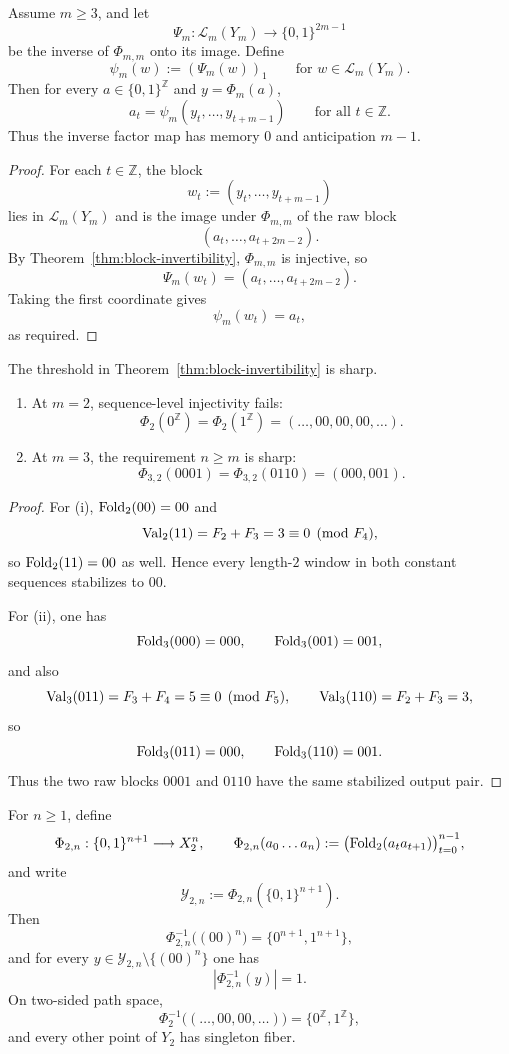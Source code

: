 \begin{corollary}\label{cor:explicit-decoder}
Assume $m\ge 3$, and let
\[
\Psi_m:\mathcal L_m(Y_m)\to\{0,1\}^{2m-1}
\]
be the inverse of $\Phi_{m,m}$ onto its image. Define
\[
\psi_m(w):=(\Psi_m(w))_1
\qquad\text{for }w\in\mathcal L_m(Y_m).
\]
Then for every $a\in\{0,1\}^{\mathbb Z}$ and $y=\Phi_m(a)$,
\[
a_t=\psi_m(y_t,\dots,y_{t+m-1})
\qquad\text{for all }t\in\mathbb Z.
\]
Thus the inverse factor map has memory $0$ and anticipation $m-1$.
\end{corollary}

\begin{proof}
For each $t\in\mathbb Z$, the block
\[
w_t:=(y_t,\dots,y_{t+m-1})
\]
lies in $\mathcal L_m(Y_m)$ and is the image under $\Phi_{m,m}$ of the raw block
\[
(a_t,\dots,a_{t+2m-2}).
\]
By Theorem~\ref{thm:block-invertibility}, $\Phi_{m,m}$ is injective, so
\[
\Psi_m(w_t)=(a_t,\dots,a_{t+2m-2}).
\]
Taking the first coordinate gives
\[
\psi_m(w_t)=a_t,
\]
as required.
\end{proof}

\begin{proposition}\label{prop:low-window-counterexamples}
The threshold in Theorem~\ref{thm:block-invertibility} is sharp.
\begin{enumerate}[label=(\roman*),leftmargin=*,itemsep=2pt]
  \item At $m=2$, sequence-level injectivity fails:
  \[
  \Phi_2(0^{\mathbb Z})=\Phi_2(1^{\mathbb Z})=(\ldots,00,00,00,\ldots).
  \]
  \item At $m=3$, the requirement $n\ge m$ is sharp:
  \[
  \Phi_{3,2}(0001)=\Phi_{3,2}(0110)=(000,001).
  \]
\end{enumerate}
\end{proposition}

\begin{proof}
For (i), $\mathrm{Fold}_2(00)=00$ and
\[
\mathrm{Val}_2(11)=F_2+F_3=3\equiv 0\pmod{F_4},
\]
so $\mathrm{Fold}_2(11)=00$ as well. Hence every length-$2$ window in both constant sequences stabilizes to $00$.

For (ii), one has
\[
\mathrm{Fold}_3(000)=000,\qquad \mathrm{Fold}_3(001)=001,
\]
and also
\[
\mathrm{Val}_3(011)=F_3+F_4=5\equiv 0\pmod{F_5},
\qquad
\mathrm{Val}_3(110)=F_2+F_3=3,
\]
so
\[
\mathrm{Fold}_3(011)=000,
\qquad
\mathrm{Fold}_3(110)=001.
\]
Thus the two raw blocks $0001$ and $0110$ have the same stabilized output pair.
\end{proof}

\begin{theorem}\label{thm:m2-branch-locus}
For $n\ge 1$, define
\[
\Phi_{2,n}:\{0,1\}^{n+1}\longrightarrow X_2^n,
\qquad
\Phi_{2,n}(a_0\ldots a_n):=\bigl(\mathrm{Fold}_2(a_ta_{t+1})\bigr)_{t=0}^{n-1},
\]
and write
\[
\mathcal Y_{2,n}:=\Phi_{2,n}(\{0,1\}^{n+1}).
\]
Then
\[
\Phi_{2,n}^{-1}\bigl((00)^n\bigr)=\{0^{n+1},1^{n+1}\},
\]
and for every $y\in\mathcal Y_{2,n}\setminus\{(00)^n\}$ one has
\[
|\Phi_{2,n}^{-1}(y)|=1.
\]
On two-sided path space,
\[
\Phi_2^{-1}\bigl((\ldots,00,00,\ldots)\bigr)=\{0^{\mathbb Z},1^{\mathbb Z}\},
\]
and every other point of $Y_2$ has singleton fiber.
\end{theorem}

